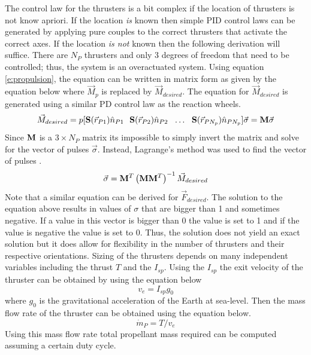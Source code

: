 \documentclass{article}
\begin{document}
The control law for the thrusters is a bit complex if the location of
thrusters is not know apriori. If the location {\it is} known then
simple PID control laws can be generated by applying pure couples to
the correct thrusters that activate the correct axes. If the location
{\it is not} known then the following derivation will suffice. There
are $N_P$ thrusters and only 3 degrees of freedom that need to be
controlled; thus, the system is an overactuated system. Using equation
\ref{e:propulsion}, the equation can be written in matrix form as
given by the equation below where $\vec{M}_p$ is replaced by
$\vec{M}_{desired}$. The equation for $\vec{M}_{desired}$ is generated
using a similar PD control law as the reaction wheels. 
\begin{equation}
  \vec{M}_{desired} = p[{\bf S}(\vec{r}_{P1})\hat{n}_{P1}~~{\bf
      S}(\vec{r}_{P2})\hat{n}_{P2}~~\hdots~~{\bf
      S}(\vec{r}_{P{N_p}})\hat{n}_{P{N_p}}]\vec{\sigma} = {\bf M}\vec{\sigma}
\end{equation}
Since ${\bf M}$ is a $3\times{N_P}$ matrix its impossible to simply
invert the matrix and solve for the vector of pulses
$\vec{\sigma}$. Instead, Lagrange's method was used to find the vector
of pulses \cite{lagrange}.
\begin{equation}
  \vec{\sigma} = {\bf M}^T\left({\bf M}{\bf M}^T\right)^{-1}\vec{M}_{desired}
\end{equation}
Note that a similar equation can be derived for
$\vec{F}_{desired}$. The solution to the equation above results in
values of $\sigma$ that are bigger than 1 and sometimes negative. If a
value in this vector is bigger than 0 the value is set to 1 and
if the value is negative the value is set to 0. Thus, the solution
does not yield an exact solution but it does allow for flexibility in
the number of thrusters and their respective orientations. Sizing of
the thrusters depends on many independent variables 
including the thrust $T$ and the $I_{sp}$. Using the $I_{sp}$ the exit
velocity of the thruster can be obtained by using the equation below
\begin{equation}
  v_e = I_{sp}g_0
\end{equation}
where $g_0$ is the gravitational acceleration of the Earth at
sea-level. Then the mass flow rate of the thruster can be obtained
using the equation below.
\begin{equation}
  \dot{m}_P = T/v_e
\end{equation}
Using this mass flow rate total propellant mass required can be
computed assuming a certain duty cycle.
\end{document}

